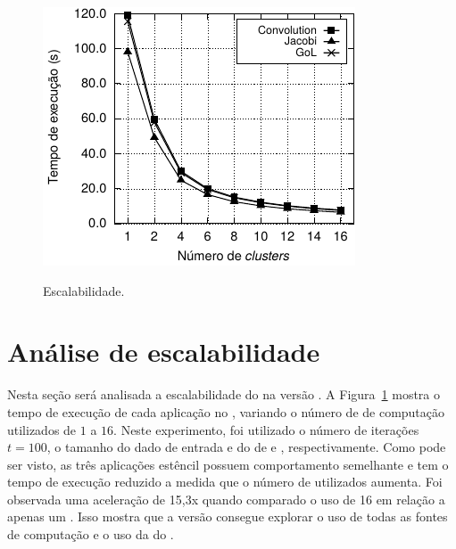 \begin{figure}[H]
	\centering
	\caption{Escalabilidade.}
	\includegraphics[width=.6\textwidth]{figs/MPPAPlotScalabilityAPI.pdf}
	\label{fig:escalabilidade}
\end{figure}


\section{Análise de escalabilidade}
\label{sec:analise_escalabilidade}

Nesta seção será analisada a escalabilidade do \pskelmppa na versão \async. A Figura~\ref{fig:escalabilidade} mostra o tempo de execução de cada aplicação no \mppa, variando o número de \clusters de computação utilizados de $1$ a $16$. Neste experimento, foi utilizado o número de iterações $t=100$, o tamanho do dado de entrada e do \tile de \ind e \tiled, respectivamente. Como pode ser visto, as três aplicações estêncil possuem comportamento semelhante e tem o tempo de execução reduzido a medida que o número de \clusters utilizados aumenta. Foi observada uma aceleração de 15,3x quando comparado o uso de 16 \clusters em relação a apenas um \cluster. Isso mostra que a versão \pskelmppa \async consegue explorar o uso de todas as fontes de computação e o uso da \noc do \mppa.

